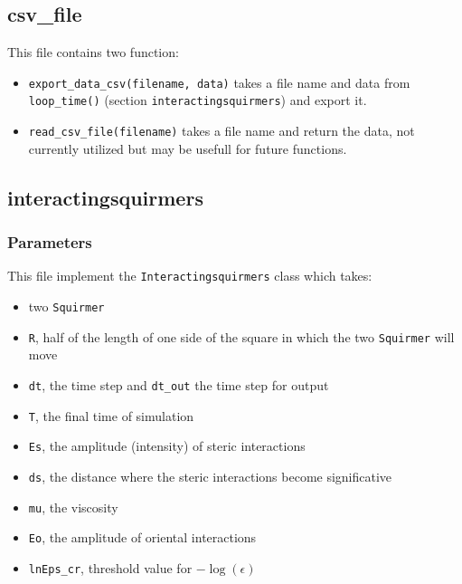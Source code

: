 \documentclass{article}
\begin{document}
\subsection*{csv\_file}
This file contains two function:
\begin{itemize}
   \item \texttt{export\_data\_csv(filename, data)} takes a file name and data from \texttt{loop\_time()} (section \texttt{interactingsquirmers}) and export it.
   \item \texttt{read\_csv\_file(filename)} takes a file name and return the data, not currently utilized but may be usefull for future functions.
\end{itemize}

\subsection*{interactingsquirmers}
\subsubsection*{Parameters}
This file implement the \texttt{Interactingsquirmers} class which takes:
\begin{itemize}
   \item two \texttt{Squirmer}
   \item \texttt{R}, half of the length of one side of the square in which the two \texttt{Squirmer} will move
   \item \texttt{dt}, the time step and \texttt{dt\_out} the time step for output
   \item \texttt{T}, the final time of simulation
   \item \texttt{Es}, the amplitude (intensity) of steric interactions
   \item \texttt{ds}, the distance where the steric interactions become significative
   \item \texttt{mu}, the viscosity
   \item \texttt{Eo}, the amplitude of oriental interactions
   \item \texttt{lnEps\_cr}, threshold value for \( -\log(\epsilon) \)
\end{itemize}
\end{document}
